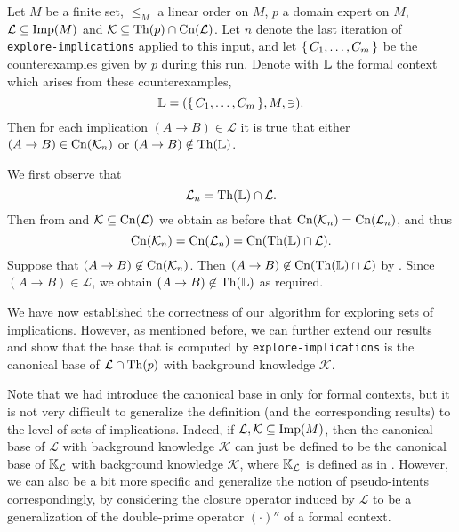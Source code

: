 \begin{Theorem}
  \label{thm:explore-implications-counterexamples-context}
  Let $M$ be a finite set, $\leq_{M}$ a linear order on $M$, $p$ a domain expert on $M$,
  $\mathcal{L} \subseteq \operatorname{Imp}(M)$ and $\mathcal{K} \subseteq \operatorname{Th}(p) \cap
  \operatorname{Cn}(\mathcal{L})$.  Let $n$ denote the last iteration of
  \lstinline{explore-implications} applied to this input, and let ${\{\, C_{1}, \dots,
    C_{m} \,\}}$ be the counterexamples given by $p$ during this run.  Denote with ${\mathbb{L}}$
  the formal context which arises from these counterexamples, \ie
  \begin{equation*}
    {\ensuremath{\mathbb{L}}} = ({\{\, C_{1}, \dots, C_{m} \,\}}, M, \ni).
  \end{equation*}
  Then for each implication $(A \to B) \in \mathcal{L}$ it is true that either $(A \to B)
  \in \operatorname{Cn}(\mathcal{K}_{n})$ or $(A \to B) \notin \operatorname{Th}({\mathbb{L}})$.
\end{Theorem}
\begin{Proof}
  We first observe that
  \begin{equation}
    \label{eq:40}
    \mathcal{L}_{n} = \operatorname{Th}({\mathbb{L}}) \cap \mathcal{L}.
  \end{equation}
  Then from  and $\mathcal{K} \subseteq
  \operatorname{Cn}(\mathcal{L})$ we obtain as before that $\operatorname{Cn}(\mathcal{K}_{n}) =
  \operatorname{Cn}(\mathcal{L}_{n})$, and thus
  \begin{equation}
    \label{eq:37}
    \operatorname{Cn}(\mathcal{K}_{n}) = \operatorname{Cn}(\mathcal{L}_{n}) = \operatorname{Cn}(\operatorname{Th}({\mathbb{L}}) \cap \mathcal{L}).
  \end{equation}
  Suppose that $(A \to B) \not\in \operatorname{Cn}(\mathcal{K}_{n})$.  Then $(A \to B) \not\in
  \operatorname{Cn}(\operatorname{Th}({\mathbb{L}}) \cap \mathcal{L})$ by .  Since $(A \to B) \in \mathcal{L}$,
  we obtain $(A \to B) \not\in \operatorname{Th}({\mathbb{L}})$ as required.
\end{Proof}

We have now established the correctness of our algorithm for exploring sets of
implications.  However, as mentioned before, we can further extend our results and show
that the base that is computed by \lstinline{explore-implications} is the canonical base
of $\mathcal{L} \cap \operatorname{Th}(p)$ with background knowledge $\mathcal{K}$.

Note that we had introduce the canonical base in  only for
formal contexts, but it is not very difficult to generalize the definition (and the
corresponding results) to the level of sets of implications.  Indeed, if $\mathcal{L},
\mathcal{K} \subseteq \operatorname{Imp}(M)$, then the canonical base of $\mathcal{L}$ with background
knowledge $\mathcal{K}$ can just be defined to be the canonical base of ${\mathbb{K}}_{\mathcal{L}}$ with background knowledge $\mathcal{K}$, where ${\mathbb{K}}_{\mathcal{L}}$ is
defined as in .  However, we can also be a bit
more specific and generalize the notion of pseudo-intents correspondingly, by considering
the closure operator induced by $\mathcal{L}$ to be a generalization of the double-prime
operator $(\cdot)''$ of a formal context.

